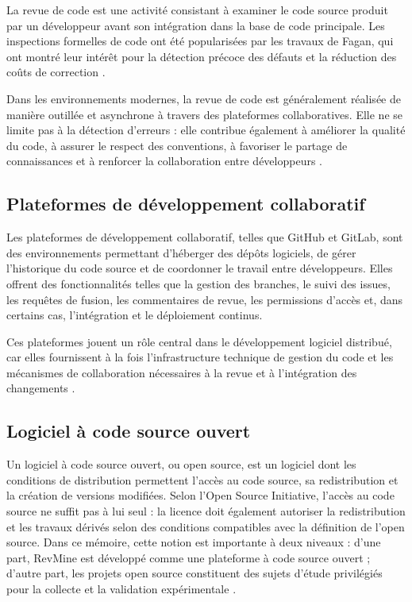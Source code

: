 La revue de code est une activité consistant à examiner le code source produit par un développeur avant son intégration dans la base de code principale. Les inspections formelles de code ont été popularisées par les travaux de Fagan, qui ont montré leur intérêt pour la détection précoce des défauts et la réduction des coûts de correction \cite{fagan1976design}.

Dans les environnements modernes, la revue de code est généralement réalisée de manière outillée et asynchrone à travers des plateformes collaboratives. Elle ne se limite pas à la détection d’erreurs : elle contribue également à améliorer la qualité du code, à assurer le respect des conventions, à favoriser le partage de connaissances et à renforcer la collaboration entre développeurs \cite{bacchelli2013expectations,mcintosh2014impact}.



\subsection{Plateformes de développement collaboratif}

Les plateformes de développement collaboratif, telles que GitHub et GitLab, sont des environnements permettant d’héberger des dépôts logiciels, de gérer l’historique du code source et de coordonner le travail entre développeurs. Elles offrent des fonctionnalités telles que la gestion des branches, le suivi des issues, les requêtes de fusion, les commentaires de revue, les permissions d’accès et, dans certains cas, l’intégration et le déploiement continus.

Ces plateformes jouent un rôle central dans le développement logiciel distribué, car elles fournissent à la fois l’infrastructure technique de gestion du code et les mécanismes de collaboration nécessaires à la revue et à l’intégration des changements \cite{kalliamvakou2014promises,github_about_pr,gitlab_merge_requests}.



\subsection{Logiciel à code source ouvert}
Un logiciel à code source ouvert, ou open source, est un logiciel dont les conditions de distribution permettent l’accès au code source, sa redistribution et la création de versions modifiées. Selon l’Open Source Initiative, l’accès au code source ne suffit pas à lui seul : la licence doit également autoriser la redistribution et les travaux dérivés selon des conditions compatibles avec la définition de l’open source. Dans ce mémoire, cette notion est importante à deux niveaux : d’une part, RevMine est développé comme une plateforme à code source ouvert ; d’autre part, les projets open source constituent des sujets d’étude privilégiés pour la collecte et la validation expérimentale \cite{osi_osd}.


